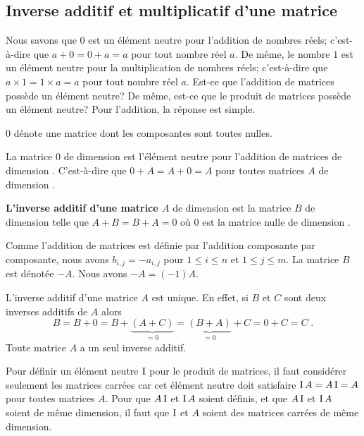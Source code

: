 {\subsection{Inverse additif et multiplicatif d'une matrice}

Nous savons que $0$ est un élément neutre pour l'addition de nombres
réels; c'est-à-dire que $a+0 = 0+a = a$ pour tout nombre réel $a$. De
même, le nombre $1$ est un élément neutre pour la multiplication de
nombres réels; c'est-à-dire que $a \times 1 = 1 \times a = a$ pour
tout nombre réel $a$. Est-ce que l'addition de matrices possède un
élément neutre?  De même, est-ce que le produit de matrices possède un
élément neutre?  Pour l'addition, la réponse est simple.

\begin{defn}
$0$ dénote une matrice dont les composantes sont toutes nulles.
\end{defn}

\begin{prop}
La matrice $0$ de dimension  est l'élément neutre pour
l'addition de matrices de dimension .  C'est-à-dire que
$0 + A = A + 0 = A$ pour toutes matrices $A$ de dimension .
\end{prop}

\begin{defn} 
{\bfseries L'inverse additif d'une matrice $A$} de dimension 
est la matrice $B$ de dimension  telle que $A+B=B+A = 0$ où
$0$ est la matrice nulle de dimension .

Comme l'addition de matrices est définie par l'addition composante par
composante, nous avons $b_{i,j} = -a_{i,j}$ pour $1\leq i \leq n$ et
$1 \leq j \leq m$.  La matrice $B$ est dénotée $-A$.
Nous avons $-A = (-1) A$.
\end{defn}

L'inverse additif d'une matrice $A$ est unique.  En effet, si $B$ et
$C$ sont deux inverses additifs de $A$ alors
\[
B = B + 0 = B + \underbrace{(A + C)}_{=0}
= \underbrace{(B+A)}_{=0} + C = 0 + C = C \; .
\]
Toute matrice $A$ a un seul inverse additif.

Pour définir un élément neutre $\operatorname{I}$ pour le produit de matrices, il
faut considérer seulement les matrices carrées car cet élément neutre
doit satisfaire $\operatorname{I} A = A \operatorname{I} = A$ pour toutes matrices $A$.  Pour
que $A \operatorname{I}$ et $\operatorname{I} A$ soient définis, et que $A \operatorname{I}$ et $\operatorname{I} A$
soient de même dimension, il faut que $\operatorname{I}$ et $A$ soient des matrices
carrées de même dimension.

}
